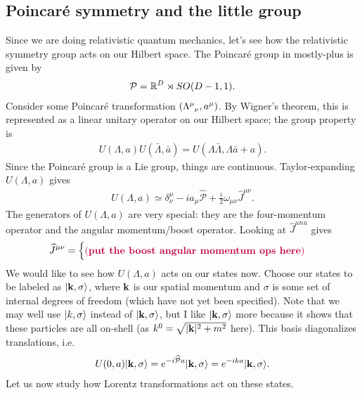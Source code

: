 \documentclass[11pt]{article}
\begin{document}
\subsection{Poincaré symmetry and the little group}
Since we are doing relativistic quantum mechanics, let's
see how the relativistic symmetry group acts on our Hilbert space.
The Poincaré group in mostly-plus is given by
\begin{align*}
    \mathcal{P} = \mathbb{R}^D \rtimes SO(D - 1, 1).
\end{align*}
Consider some Poincaré transformation $(\Lambda\indices{^\mu_\nu}, a^\mu)$.
By Wigner's theorem, this is represented as a linear unitary operator on
our Hilbert space; the group property is
\begin{align*}
    U(\Lambda, a) U(\bar{\Lambda}, \bar{a}) = U(\Lambda \bar{\Lambda}, \Lambda \bar{a} + a).
\end{align*}
Since the Poincaré group is a Lie group, things are continuous.
Taylor-expanding $U(\Lambda, a)$ gives
\begin{align*}
    U(\Lambda, a) \simeq \delta^{\mu}_{\nu} - i a_\mu \widehat{\mathcal{P}} + \frac{i}{2} \omega_{\mu \nu} \widehat{J}^{\mu \nu}.
\end{align*}
The generators of $U(\Lambda, a)$ are very special: they are the
four-momentum operator and the angular momentum/boost operator.
Looking at $\widehat{J}^{\mu nu}$ gives
\begin{align*}
    \widehat{J}^{\mu \nu} = \begin{cases}
        \color{purple} (\textbf{put the boost angular momentum ops here}) \color{black}
    \end{cases}
\end{align*}
We would like to see how $U(\Lambda, a)$ acts on our states now.
Choose our states to be labeled as $\lvert\mathbf{k}, \sigma\rangle$, where
$\mathbf{k}$ is our spatial momentum and $\sigma$ is some set of internal
degrees of freedom (which have not yet been specified). Note that
we may well use $\lvert k, \sigma\rangle$ instead of $\lvert\mathbf{k}, \sigma\rangle$,
but I like $\lvert\mathbf{k}, \sigma\rangle$ more because it shows that these
particles are all on-shell (as $k^0 = \sqrt{|\mathbf{k}|^2 + m^2}$ here).
This basis diagonalizes translations, i.e.
\begin{align*}
    U(0, a) \lvert\mathbf{k}, \sigma\rangle = e^{- i \widehat{\mathcal{P}} a} \lvert\mathbf{k}, \sigma\rangle = e^{-i k a} \lvert\mathbf{k}, \sigma\rangle.
\end{align*}
Let us now study how Lorentz transformations act on these states.
\end{document}
